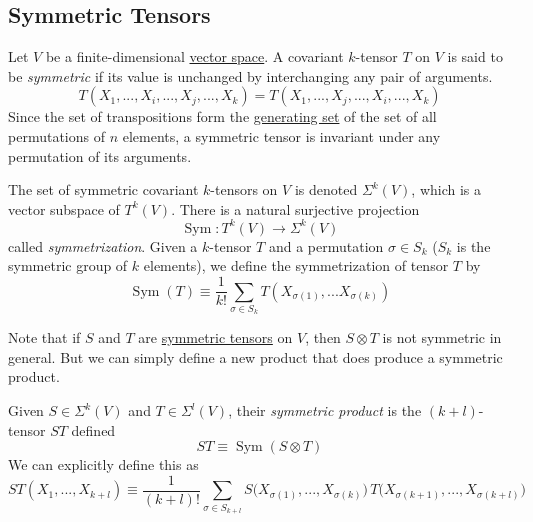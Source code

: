 \documentclass{article}
\DeclareMathOperator{\Sym}{Sym}
\newcounter{definition}[section]
\begin{document}
  \subsection{Symmetric Tensors}
    \begin{definition}
      \label{def:symmetric-tensor}
    Let $V$ be a finite-dimensional \hyperref[lin-def:vector-space]{vector space}. A covariant $k$-tensor $T$ on $V$ is said to be \textit{symmetric} if its value is unchanged by interchanging any pair of arguments. 
    \begin{equation}
      T(X_1,..., X_i, ..., X_j, ..., X_k) = T(X_1,..., X_j, ..., X_i, ..., X_k)
    \end{equation}
    Since the set of transpositions form the \hyperref[alg-def:generating-set]{generating set} of the set of all permutations of $n$ elements, a symmetric tensor is invariant under any permutation of its arguments. 
    \end{definition}

    \begin{definition}[Symmetrization]
      \label{def:symmetrization}
    The set of symmetric covariant $k$-tensors on $V$ is denoted $\Sigma^k (V)$, which is a vector subspace of $T^k (V)$. There is a natural surjective projection 
    \begin{equation}
      \Sym: T^k (V) \to \Sigma^k (V)
    \end{equation}
    called \textit{symmetrization}. Given a $k$-tensor $T$ and a permutation $\sigma \in S_k$ ($S_k$ is the symmetric group of $k$ elements), we define the symmetrization of tensor $T$ by
    \begin{equation}
      \Sym(T) \equiv \frac{1}{k!} \sum_{\sigma \in S_k} T (X_{\sigma(1)}, ... X_{\sigma(k)})
    \end{equation}
    \end{definition}

    Note that if $S$ and $T$ are \hyperref[def:symmetric-tensor]{symmetric tensors} on $V$, then $S \otimes T$ is not symmetric in general. But we can simply define a new product that does produce a symmetric product. 

    \begin{definition}
      \label{def:symmetric-product}
    Given $S \in \Sigma^k (V)$ and $T \in \Sigma^l (V)$, their \textit{symmetric product} is the $(k+l)$-tensor $ST$ defined
    \begin{equation}
      S T \equiv \Sym(S \otimes T)
    \end{equation}
    We can explicitly define this as 
    \begin{equation}
      ST(X_1, ..., X_{k+l}) \equiv \frac{1}{(k+l)!} \sum_{\sigma \in S_{k+l}} S\big(X_{\sigma(1)}, ..., X_{\sigma(k)} \big)\, T\big( X_{\sigma(k+1)}, ..., X_{\sigma(k+l)} \big)
    \end{equation}
    \end{definition}
\end{document}
